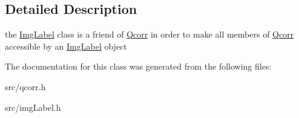 \subsection{Detailed Description}
the \hyperlink{classImgLabel}{ImgLabel} class is a friend of \hyperlink{classQcorr}{Qcorr} in order to make all members of \hyperlink{classQcorr}{Qcorr} accessible by an \hyperlink{classImgLabel}{ImgLabel} object 

The documentation for this class was generated from the following files:\begin{CompactItemize}
\item 
src/qcorr.h\item 
src/imgLabel.h\end{CompactItemize}
